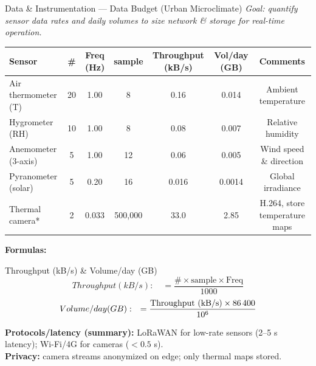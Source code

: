 \documentclass{beamer}
\begin{document}
\begin{frame}{Data \& Instrumentation — Data Budget (Urban Microclimate)}
\tiny
\setlength{\tabcolsep}{3pt}  
\textit{Goal: quantify sensor data rates and daily volumes to size network \& storage for real-time operation.}

\vspace{2mm}
\begin{tabular}{lcccccc}
\textbf{Sensor} & \textbf{\#} & \textbf{Freq (Hz)} & \textbf{sample} & \textbf{Throughput (kB/s)} & \textbf{Vol/day (GB)} & \textbf{Comments} \\
\hline
Air thermometer (T)   & 20 & 1.00  & 8        & 0.16  & 0.014 & Ambient temperature \\
Hygrometer (RH)       & 10 & 1.00  & 8        & 0.08  & 0.007 & Relative humidity \\
Anemometer (3-axis)   & 5  & 1.00  & 12       & 0.06  & 0.005 & Wind speed \& direction \\
Pyranometer (solar)   & 5  & 0.20  & 16       & 0.016 & 0.0014& Global irradiance \\
Thermal camera*       & 2  & 0.033 & 500{,}000& 33.0  & 2.85  & H.264, store temperature maps \\
\hline
\end{tabular}

\vspace{1mm}
\footnotesize
\textbf{Formulas:}
\begin{block}{Throughput (kB/s) & Volume/day (GB)}
    $$Throughput (kB/s): \quad = \dfrac{\# \times \text{sample} \times \text{Freq}}{1000}$$
    $$ \noindent Volume/day (GB): \quad = \dfrac{\text{Throughput (kB/s)} \times 86\,400}{10^{6}}$$
\end{block}
\vspace{0.5mm}
\scriptsize
\textbf{Protocols/latency (summary):} LoRaWAN for low-rate sensors (2–5 s latency); Wi-Fi/4G for cameras ($<0.5$ s).  \\
\textbf{Privacy:} camera streams anonymized on edge; only thermal maps stored.
\end{frame}
\end{document}
